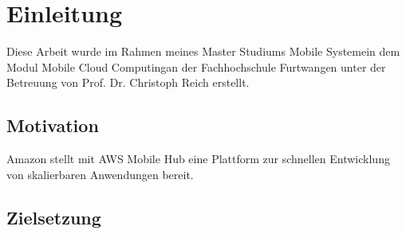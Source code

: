 \chapter{Einleitung}
Diese Arbeit wurde im Rahmen meines Master Studiums \glqq Mobile Systeme\grqq in dem Modul \glqq Mobile Cloud Computing\grqq an der Fachhochschule Furtwangen unter der Betreuung von Prof. Dr. Christoph Reich erstellt.

\section{Motivation}

Amazon stellt mit \acs{AWS} Mobile Hub eine Plattform zur schnellen Entwicklung von skalierbaren Anwendungen bereit.

\section{Zielsetzung}